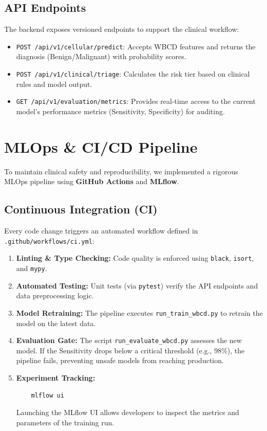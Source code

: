 \subsection{API Endpoints}
The backend exposes versioned endpoints to support the clinical workflow:
\begin{itemize}
    \item \texttt{POST /api/v1/cellular/predict}: Accepts WBCD features and returns the diagnosis (Benign/Malignant) with probability scores.
    \item \texttt{POST /api/v1/clinical/triage}: Calculates the risk tier based on clinical rules and model output.
    \item \texttt{GET /api/v1/evaluation/metrics}: Provides real-time access to the current model's performance metrics (Sensitivity, Specificity) for auditing.
\end{itemize}

\section{MLOps \& CI/CD Pipeline}
To maintain clinical safety and reproducibility, we implemented a rigorous MLOps pipeline using \textbf{GitHub Actions} and \textbf{MLflow}.

\subsection{Continuous Integration (CI)}
Every code change triggers an automated workflow defined in \texttt{.github/workflows/ci.yml}:
\begin{enumerate}
    \item \textbf{Linting \& Type Checking:} Code quality is enforced using \texttt{black}, \texttt{isort}, and \texttt{mypy}.
    \item \textbf{Automated Testing:} Unit tests (via \texttt{pytest}) verify the API endpoints and data preprocessing logic.
    \item \textbf{Model Retraining:} The pipeline executes \texttt{run\_train\_wbcd.py} to retrain the model on the latest data.
    \item \textbf{Evaluation Gate:} The script \texttt{run\_evaluate\_wbcd.py} assesses the new model. If the Sensitivity drops below a critical threshold (e.g., 98\%), the pipeline fails, preventing unsafe models from reaching production.
    \item \textbf{Experiment Tracking:}
    \begin{verbatim}
    mlflow ui
    \end{verbatim}
    Launching the MLflow UI allows developers to inspect the metrics and parameters of the training run.
\end{enumerate}

